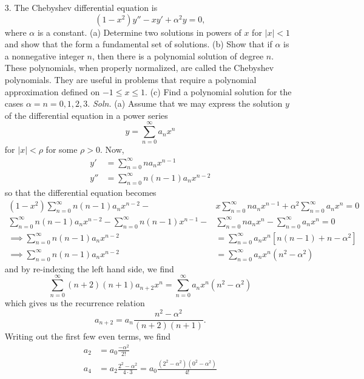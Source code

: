 \documentclass{article}
\begin{document}
\begin{itemize}
\begin{itemize}
        
    \end{itemize}
    \pagebreak
    \item[3.] The Chebyshev differential equation is
    \[(1 - x^2)y'' - xy' + \alpha^2y = 0,\]
    where $\alpha$ is a constant. (a) Determine two solutions in powers of $x$ for $|x| < 1$ and show that the form a fundamental set of solutions. (b) Show that if $\alpha$ is a nonnegative integer $n$, then there is a polynomial solution of degree $n$. These polynomials, when properly normalized, are called the Chebyshev polynomials. They are useful in problems that require a polynomial approximation defined on $-1 \leq x \leq 1$. (c) Find a polynomial solution for the cases $\alpha = n = 0, 1, 2, 3$.
    \newline\newline
    \textit{Soln.} (a) Assume that we may express the solution $y$ of the differential equation in a power series
    \[y = \sum_{n = 0}^{\infty}a_n x^n\]
    for $|x| < \rho$ for some $\rho > 0$. Now, 
    \begin{align*}
        y' &= \sum_{n = 0}^{\infty} na_n x^{n-1}\\
        y'' &= \sum_{n = 0}^{\infty} n(n-1)a_n x^{n-2}
    \end{align*}
    so that the differential equation becomes
    \begin{align*}
        (1-x^2)\sum_{n = 0}^{\infty} n(n-1)a_nx^{n-2} - &x\sum_{n = 0}^{\infty} na_nx^{n-1} + \alpha^2 \sum_{n = 0}^{\infty} a_nx^n = 0\\
        \sum_{n = 0}^{\infty} n(n-1)a_nx^{n-2} - \sum_{n = 0}^{\infty}n(n-1)x^{n-1} - &\sum_{n = 0}^{\infty} na_nx^n - \sum_{n = 0}^{\infty} a_nx^n = 0\\
        \implies \sum_{n = 0}^{\infty} n(n-1)a_nx^{n-2} &= \sum_{n = 0}^{\infty} a_nx^n[n(n-1) + n - \alpha^2]\\
        \implies \sum_{n = 0}^{\infty} n(n-1)a_nx^{n-2} &= \sum_{n = 0}^{\infty} a_nx^n(n^2 - \alpha^2)
    \end{align*}
    and by re-indexing the left hand side, we find
    \[\sum_{n = 0}^{\infty} (n+2)(n+1)a_{n+2}x^n = \sum_{n = 0}^{\infty} a_nx^n(n^2 - \alpha^2)\]
    which gives us the recurrence relation
    \[a_{n+2} = a_n \frac{n^2 - \alpha^2}{(n + 2)(n+1)}.\]
    Writing out the first few even terms, we find
    \begin{align*}
        a_2 &= a_0\frac{-\alpha^2}{2!}\\
        a_4 &= a_2\frac{2^2 - \alpha^2}{4\cdot3} = a_0\frac{(2^2 - \alpha^2)(0^2 - \alpha^2)}{4!}\\

\end{align*}
\end{itemize}
\end{document}
